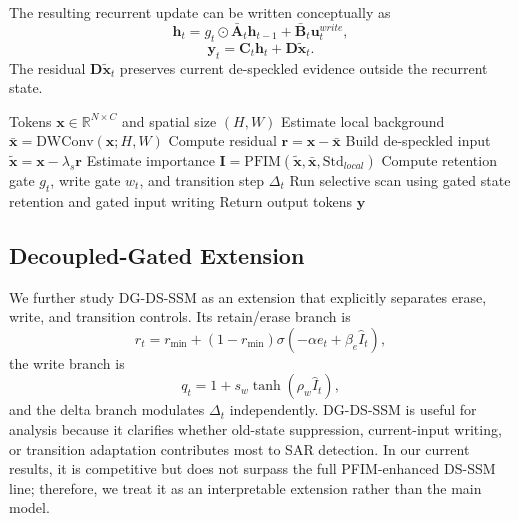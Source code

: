 \documentclass[10pt]{article}
\begin{document}
The resulting recurrent update can be written conceptually as
\begin{equation}
  \mathbf{h}_t =
  g_t \odot \bar{\mathbf{A}}_t\mathbf{h}_{t-1}
  + \bar{\mathbf{B}}_t\mathbf{u}^{write}_t,
\end{equation}
\begin{equation}
  \mathbf{y}_t = \mathbf{C}_t\mathbf{h}_t + \mathbf{D}\widetilde{\mathbf{x}}_t.
\end{equation}
The residual $\mathbf{D}\widetilde{\mathbf{x}}_t$ preserves current de-speckled evidence outside the recurrent state.

\begin{algorithm}[t]
\caption{IG-DS-SSM Forward Pass}
\begin{algorithmic}[1]
\REQUIRE Tokens $\mathbf{x}\in\mathbb{R}^{N\times C}$ and spatial size $(H,W)$
\STATE Estimate local background $\bar{\mathbf{x}}=\mathrm{DWConv}(\mathbf{x};H,W)$
\STATE Compute residual $\mathbf{r}=\mathbf{x}-\bar{\mathbf{x}}$
\STATE Build de-speckled input $\widetilde{\mathbf{x}}=\mathbf{x}-\lambda_s\mathbf{r}$
\STATE Estimate importance $\mathbf{I}=\mathrm{PFIM}(\widetilde{\mathbf{x}},\bar{\mathbf{x}},\mathrm{Std}_{local})$
\STATE Compute retention gate $g_t$, write gate $w_t$, and transition step $\Delta_t$
\STATE Run selective scan using gated state retention and gated input writing
\STATE Return output tokens $\mathbf{y}$
\end{algorithmic}
\end{algorithm}

\subsection{Decoupled-Gated Extension}

We further study DG-DS-SSM as an extension that explicitly separates erase, write, and transition controls. Its retain/erase branch is
\begin{equation}
  r_t = r_{\min} + (1-r_{\min})\sigma(-\alpha e_t+\beta_e\hat{I}_t),
\end{equation}
the write branch is
\begin{equation}
  q_t = 1+s_w\tanh(\rho_w\hat{I}_t),
\end{equation}
and the delta branch modulates $\Delta_t$ independently. DG-DS-SSM is useful for analysis because it clarifies whether old-state suppression, current-input writing, or transition adaptation contributes most to SAR detection. In our current results, it is competitive but does not surpass the full PFIM-enhanced DS-SSM line; therefore, we treat it as an interpretable extension rather than the main model.
\end{document}
